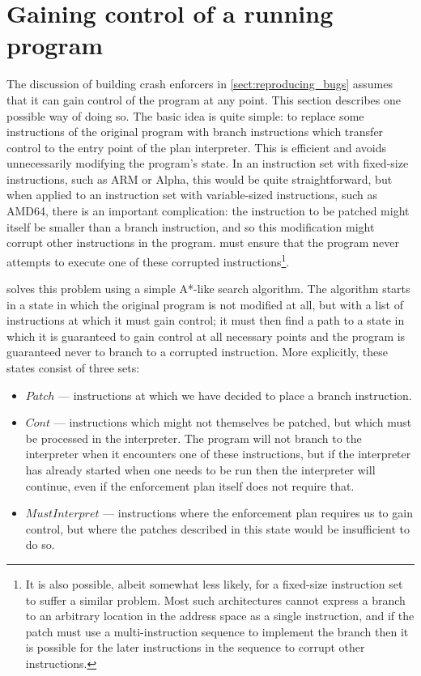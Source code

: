 \chapter{Gaining control of a running program}
\label{sect:enforce:gain_control}


The discussion of building crash enforcers in
\autoref{sect:reproducing_bugs} assumes that it can gain control of
the program at any point.  This section describes one possible way of
doing so.  The basic idea is quite simple: to replace some
instructions of the original program with branch instructions which
transfer control to the entry point of the plan interpreter.  This is
efficient and avoids unnecessarily modifying the program's state.  In
an instruction set with fixed-size instructions, such as
ARM\needCite{} or Alpha\needCite{}, this would be quite
straightforward, but when applied to an instruction set with
variable-sized instructions, such as AMD64, there is an important
complication: the instruction to be patched might itself be smaller
than a branch instruction, and so this modification might corrupt
other instructions in the program.  {\Implementation} must ensure that
the program never attempts to execute one of these corrupted
instructions\footnote{It is also possible, albeit somewhat less
  likely, for a fixed-size instruction set to suffer a similar
  problem.  Most such architectures cannot express a branch to an
  arbitrary location in the address space as a single instruction, and
  if the patch must use a multi-instruction sequence to implement the
  branch then it is possible for the later instructions in the
  sequence to corrupt other instructions.}.

{\Implementation} solves this problem using a simple A*-like search
algorithm\cite{Russell1995}.  The algorithm starts in a state in which
the original program is not modified at all, but with a list of
instructions at which it must gain control; it must then find a path
to a state in which it is guaranteed to gain control at all necessary
points and the program is guaranteed never to branch to a corrupted
instruction.  More explicitly, these states consist of three sets:

\begin{itemize}
\item $\mathit{Patch}$ --- instructions at which we have decided to place a
  branch instruction.
\item $\mathit{Cont}$ --- instructions which might not themselves be
  patched, but which must be processed in the interpreter.  The
  program will not branch to the interpreter when it encounters one of
  these instructions, but if the interpreter has already started when
  one needs to be run then the interpreter will continue, even if the
  enforcement plan itself does not require that.
\item $\mathit{MustInterpret}$ --- instructions where the enforcement
  plan requires us to gain control, but where the patches described in
  this state would be insufficient to do so.
\end{itemize}

